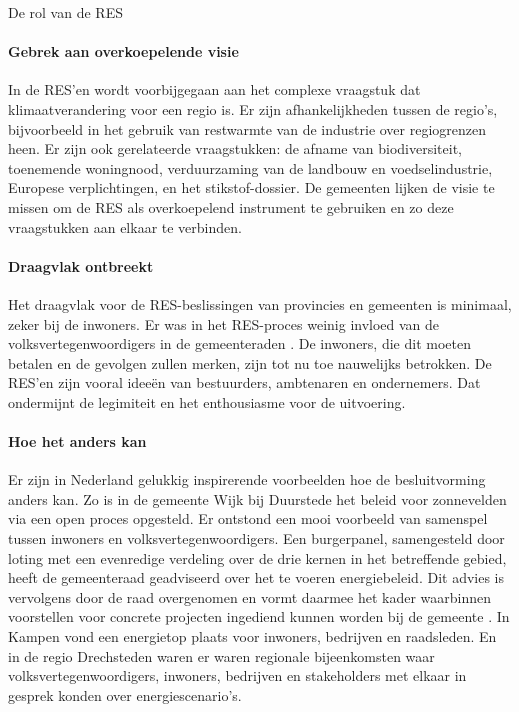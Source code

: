 \begin{voorstel}{De rol van de RES}
\begin{multicols*}{2}
\begin{overwegingen}
\paragraph{Gebrek aan overkoepelende visie}
In de RES’en wordt voorbijgegaan aan het complexe vraagstuk dat klimaatverandering voor een regio is. Er zijn afhankelijkheden tussen de regio’s, bijvoorbeeld in het gebruik van restwarmte van de industrie over regiogrenzen heen. Er zijn ook gerelateerde vraagstukken: de afname van biodiversiteit, toenemende woningnood, verduurzaming van de landbouw en voedselindustrie, Europese verplichtingen, en het stikstof-dossier. De gemeenten lijken de visie te missen om de RES als overkoepelend instrument te gebruiken en zo deze vraagstukken aan elkaar te verbinden.

\paragraph{Draagvlak ontbreekt}
Het draagvlak voor de RES-beslissingen van provincies en gemeenten is minimaal, zeker bij de inwoners. Er was in het RES-proces weinig invloed van de volksvertegenwoordigers in de gemeenteraden \parencite{prins_eis_2020}. De inwoners, die dit moeten betalen en de gevolgen zullen merken, zijn tot nu toe nauwelijks betrokken. De RES’en zijn vooral ideeën van bestuurders, ambtenaren en ondernemers.
Dat ondermijnt de legimiteit en het enthousiasme voor de uitvoering.

\paragraph{Hoe het anders kan}
Er zijn in Nederland gelukkig inspirerende voorbeelden hoe de besluitvorming anders kan.
Zo is in de gemeente Wijk bij Duurstede het beleid voor zonnevelden via een open proces opgesteld. Er ontstond een mooi voorbeeld van samenspel tussen inwoners en volksvertegenwoordigers. Een burgerpanel, samengesteld door loting met een evenredige verdeling over de drie kernen in het betreffende gebied, heeft de gemeenteraad geadviseerd over het te voeren energiebeleid. Dit advies is vervolgens door de raad overgenomen en vormt daarmee het kader waarbinnen voorstellen voor concrete projecten ingediend kunnen worden bij de gemeente \parencite{burgerpanel_zonnevelden_wijk_bij_duurstede_advies_2019}.
In Kampen vond een energietop plaats voor inwoners, bedrijven en raadsleden. En in de regio Drechsteden waren er waren regionale bijeenkomsten waar volksvertegenwoordigers, inwoners, bedrijven en stakeholders met elkaar in gesprek konden over energiescenario’s.


\end{overwegingen}
\end{multicols*}
\end{voorstel}
